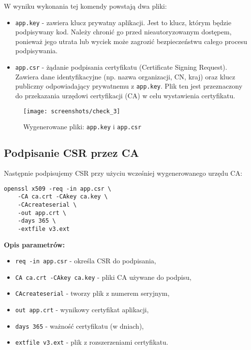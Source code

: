 \documentclass{article}
\begin{document}
\noindent W wyniku wykonania tej komendy powstają dwa pliki:
\begin{itemize}
    \item \texttt{app.key} - zawiera klucz prywatny aplikacji. Jest to klucz, którym będzie podpisywany kod. Należy chronić go przed nieautoryzowanym dostępem, ponieważ jego utrata lub wyciek może zagrozić bezpieczeństwu całego procesu podpisywania.
    \item \texttt{app.csr} - żądanie podpisania certyfikatu (Certificate Signing Request). Zawiera dane identyfikacyjne (np. nazwa organizacji, CN, kraj) oraz klucz publiczny odpowiadający prywatnemu z \texttt{app.key}. Plik ten jest przeznaczony do przekazania urzędowi certyfikacji (CA) w celu wystawienia certyfikatu.
\end{itemize}


\begin{figure}[H]
    \centering
    \texttt{[image: screenshots/check\_3]}
    \caption{Wygenerowane pliki: \texttt{app.key} i \texttt{app.csr}}
    \label{fig:key_csr_files}
\end{figure}

\subsection{Podpisanie CSR przez CA}

Następnie podpisujemy CSR przy użyciu wcześniej wygenerowanego urzędu CA:

\begin{lstlisting}[style=command, caption=Podpisywanie CSR przez CA]
openssl x509 -req -in app.csr \
    -CA ca.crt -CAkey ca.key \
    -CAcreateserial \
    -out app.crt \
    -days 365 \
    -extfile v3.ext
\end{lstlisting}

\noindent\textbf{Opis parametrów:}
\begin{itemize}
    \item \texttt{req -in app.csr} - określa CSR do podpisania,
    \item \texttt{CA ca.crt -CAkey ca.key} - pliki CA używane do podpisu,
    \item \texttt{CAcreateserial} - tworzy plik z numerem seryjnym,
    \item \texttt{out app.crt} - wynikowy certyfikat aplikacji,
    \item \texttt{days 365} - ważność certyfikatu (w dniach),
    \item \texttt{extfile v3.ext} - plik z rozszerzeniami certyfikatu.
\end{itemize}
\end{document}
